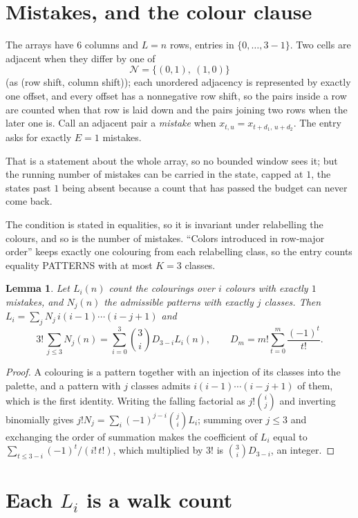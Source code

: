 \documentclass[11pt,a4paper]{article}
\theoremstyle{plain}
\newtheorem{lemma}[theorem]{Lemma}
\theoremstyle{definition}
\begin{document}
\section{Mistakes, and the colour clause}

The arrays have $6$ columns and $L=n$ rows, entries in $\{0,\dots,3-1\}$.
Two cells are adjacent when they differ by one of
\[
\mathcal N=\{(0,1),\ (1,0)\}
\]
(as (row shift, column shift)); each unordered adjacency is represented by exactly one
offset, and every offset has a nonnegative row shift, so the pairs inside a row are
counted when that row is laid down and the pairs joining two rows when the later one
is. Call an adjacent pair a \emph{mistake} when $x_{t,u}=x_{t+d_1,\,u+d_2}$. The entry asks for exactly
$E=1$ mistakes.

That is a statement about the whole array, so no bounded window sees it; but the running
number of mistakes can be carried in the state, capped at $1$, the states past $1$ being
absent because a count that has passed the budget can never come back.

The condition is stated in equalities, so it is invariant under relabelling the colours, and
so is the number of mistakes. ``Colors introduced in row-major order'' keeps exactly one
colouring from each relabelling class, so the entry counts equality PATTERNS with at most
$K=3$ classes.

\begin{lemma}\label{lem:inv}
Let $L_i(n)$ count the colourings over $i$ colours with exactly $1$ mistakes, and $N_j(n)$
the admissible patterns with exactly $j$ classes. Then
$L_i=\sum_j N_j\,i(i-1)\cdots(i-j+1)$ and
\[
3!\,\sum_{j\le3}N_j(n)=\sum_{i=0}^{3}\binom{3}{i}D_{3-i}L_i(n),
\qquad D_m=m!\sum_{t=0}^{m}\frac{(-1)^t}{t!} .
\]
\end{lemma}

\begin{proof}
A colouring is a pattern together with an injection of its classes into the palette, and a
pattern with $j$ classes admits $i(i-1)\cdots(i-j+1)$ of them, which is the first identity.
Writing the falling factorial as $j!\binom{i}{j}$ and inverting binomially gives
$j!N_j=\sum_i(-1)^{j-i}\binom{j}{i}L_i$; summing over $j\le3$ and exchanging the order
of summation makes the coefficient of $L_i$ equal to $\sum_{t\le3-i}(-1)^t/(i!\,t!)$,
which multiplied by $3!$ is $\binom{3}{i}D_{3-i}$, an integer.
\end{proof}

\section{Each $L_i$ is a walk count}
\end{document}
